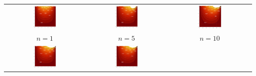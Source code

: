 \begin{shaded}
	\begin{center}
		\begin{tabular}{ccc}
			\includegraphics[width=0.3\textwidth]{./images/ch12/n1.pdf} &
			\includegraphics[width=0.3\textwidth]{./images/ch12/n5.pdf} &
			\includegraphics[width=0.3\textwidth]{./images/ch12/n10.pdf}\\
			$n=1$ & $n=5$ & $n=10$\\[1em]
			\includegraphics[width=0.3\textwidth]{./images/ch12/n20.pdf} &
			\includegraphics[width=0.3\textwidth]{./images/ch12/n30.pdf} &

\end{tabular}
\end{center}
\end{shaded}
